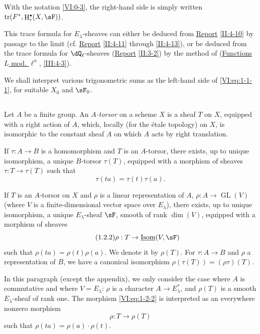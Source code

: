 \documentclass[oneside]{book}
\DeclareMathOperator{\gl}{GL}
\DeclareMathOperator{\h}{H}
\DeclareMathOperator{\tr}{tr}
\newcounter{char}
\theoremstyle{sga-source}
\theoremstyle{sga-source-dash}
\theoremstyle{sga-source-dotdash}
\theoremstyle{sga-source-number-note-dash}
\theoremstyle{sga-source-note-number-dotdash}
\theoremstyle{sga-source-example-dotdash}
\theoremstyle{sga-source-inline-number}
\theoremstyle{sga-source-bare-number}
\theoremstyle{sga-source}
\let\oldbullet\bullet
\renewcommand{\bullet}{\textnormal{\tiny$\oldbullet$}}
\newcommand{\PrintPage}[1]{}\newcommand{\MathPage}[1]{}\newcommand{\PrintCite}[2]{#1}\newcommand{\var}[3]{#2}
\begin{document}
With the notation \ref{VI:0-3}, the right-hand side is simply written 
$\tr(F^\ast,\h_c^\bullet(X,\sF))$. 

This trace formula for $E_\lambda$-sheaves can either be 
deduced from \hyperref[II]{Report} \ref{II:4-10} by passage to the limit (cf. 
\hyperref[II]{Report} \ref{II:4-11} through \ref{II:4-13}), or be deduced 
from the trace formula for $\dQ_\ell$-sheaves (\hyperref[II]{Report} 
\ref{II:3-2}) by the method of (\hyperref[III]{Functions $L$ mod. $\ell^n$}, 
\ref{III:4-3}). 

We shall interpret various trigonometric sums as the left-hand side of 
\eqref{VI:eq:1-1-1}, for suitable $X_0$ and $\sF_0$. 





\PrintPage{170}
\subsection{}\label{VI:1-2}

Let $A$ be a finite group. An \emph{$A$-torsor} on a scheme $X$ is a 
sheaf $T$ on $X$, equipped with a right action of $A$, which, locally 
(for the étale topology) on $X$, is isomorphic to the constant sheaf $A$ on 
which $A$ acts by right translation. 

If $\tau:A\to B$ is a homomorphism and $T$ is an $A$-torsor, there exists, 
up to unique isomorphism, a unique $B$-torsor $\tau(T)$, equipped with a 
morphism of sheaves $\tau:T\to \tau(T)$ such that 
\begin{equation*}\tag{1.2.1}\label{VI:eq:1-2-1}
  \tau(t a) = \tau(t) \tau(a)\text{.}
\end{equation*}

If $T$ is an $A$-torsor on $X$ and $\rho$ is a linear representation 
of $A$, $\rho:A\to \gl(V)$ (where $V$ is a finite-dimensional vector space over 
$E_\lambda$), there exists, up to unique isomorphism, a unique 
$E_\lambda$-sheaf $\sF$, smooth of rank $\dim(V)$, equipped with a morphism of 
sheaves 
\begin{equation*}\tag{1.2.2}\label{VI:eq:1-2-2}
  \rho:T\to \underline{\operatorname{Isom}}(V,\sF)
\end{equation*}
such that $\rho(t a) = \rho(t) \rho(a)$. We denote it by $\rho(T)$. For 
$\tau:A\to B$ and $\rho$ a representation of $B$, we have a canonical 
isomorphism $\rho(\tau(T)) = (\rho\tau)(T)$. 

In this paragraph (except the appendix), we only consider the case where $A$ 
is commutative and where $V=E_\lambda$: $\rho$ is a character 
$A\to E_\lambda^\ast$, and $\rho(T)$ is a smooth $E_\lambda$-sheaf of rank 
one. The morphism \eqref{VI:eq:1-2-2} is interpreted as an everywhere 
nonzero morphism 
\begin{equation*}\tag{1.2.3}\label{VI:eq:1-2-3}
  \rho:T\to \rho(T) 
\end{equation*}
such that $\rho(t a) = \rho(a)\cdot\rho(t)$. 
\end{document}
